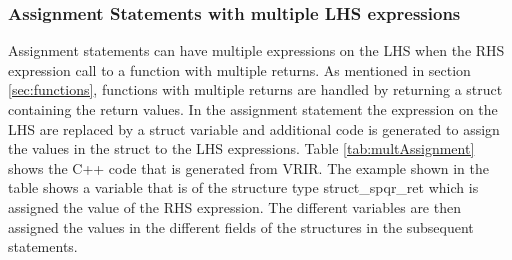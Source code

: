 \subsubsection{Assignment Statements with multiple LHS expressions}
Assignment statements can have multiple expressions on the LHS when the RHS expression call to a function  with multiple returns. As mentioned in section \ref{sec:functions}, functions with multiple returns are handled by returning a struct containing the return values. In the assignment statement the expression on the LHS are replaced by a struct variable and additional code is generated to assign the values in the struct to the LHS expressions. Table \ref{tab:multAssignment} shows the C++ code that is generated from VRIR. The example shown in the table shows a variable that is of the structure type struct\_spqr\_ret which is assigned the value of the RHS expression. The different variables are then assigned the values in the different fields of the structures in the subsequent statements.
